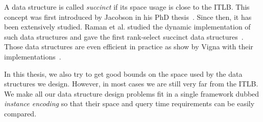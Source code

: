 A data structure is called \emph{succinct} if its space usage is close to the ITLB.
%
This concept was first introduced by Jacobson in his PhD thesis~\cite{Ja88}.
%
Since then, it has been extensively studied.
%
Raman et al. studied the dynamic implementation of such data
structures and gave the first rank-select succinct
data structures~\cite{RRS01,RRS07}.
%
%
Those data structures are even efficient in practice as show by Vigna with
their implementations~\cite{Vi08}.

In this thesis, we also try to get good bounds on the space used by the data
structures we design. However, in most cases we are still very far from the
ITLB. We make all our data structure design problems fit in a single framework
dubbed \emph{instance encoding} so that their space and query time
requirements can be easily compared.
%


